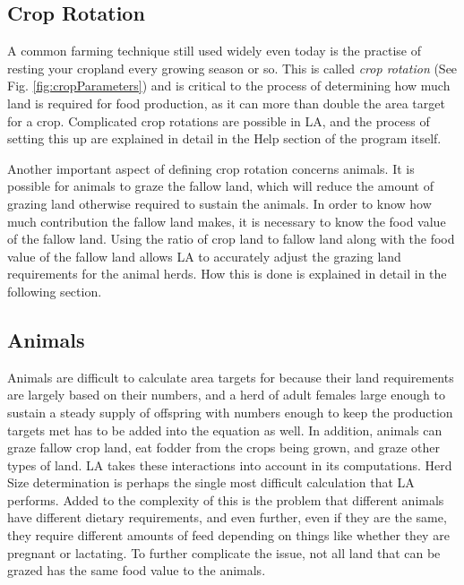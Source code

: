   \subsection{Crop Rotation}
  \label{cropRotation}
    A common farming technique still used widely even today is the practise of
    resting your cropland every growing season or so.  This is called
    \textit{crop rotation} (See Fig.  \ref{fig:cropParameters}) and is critical
    to the process of determining how much land is required for food production,
    as it can more than double the area target for a crop.  Complicated crop 
    rotations are possible in LA, and the process of setting this up are
    explained in detail in the Help section of the program itself.
  
    Another important aspect of defining crop rotation concerns animals.  It is
    possible for animals to graze the fallow land, which will reduce the amount
    of grazing land otherwise required to sustain the animals.  In order to
    know how much contribution the fallow land makes, it is necessary to know
    the food value of the fallow land.  Using the ratio of crop land to fallow
    land along with the food value of the fallow land allows LA to
    accurately adjust the grazing land requirements for the animal herds.  How
    this is done is explained in detail in the following section.

  \subsection{Animals}
    Animals are difficult to calculate area targets for because their land
    requirements are largely based on their numbers, and a herd of adult
    females large enough to sustain a steady supply of offspring with numbers
    enough to keep the production targets met has to be added into the equation
    as well.  In addition, animals can graze fallow crop land, eat fodder from
    the crops being grown, and graze other types of land.  LA takes these
    interactions into account in its computations.
    Herd Size determination is perhaps the single most difficult calculation
    that LA performs.  Added to the complexity of this is the problem that different
    animals have different dietary requirements, and even further, even if they
    are the same, they require different amounts of feed depending on things
    like whether they are pregnant or lactating.  To further complicate the issue,
    not all land that can be grazed has the same food value to the animals.
    
